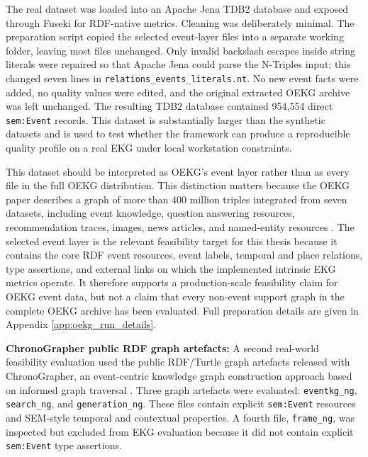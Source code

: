 The real dataset was loaded into an Apache Jena TDB2 database and exposed through Fuseki for RDF-native metrics. Cleaning was deliberately minimal. The preparation script copied the selected event-layer files into a separate working folder, leaving most files unchanged. Only invalid backslash escapes inside string literals were repaired so that Apache Jena could parse the N-Triples input; this changed seven lines in \texttt{relations\_events\_literals.nt}. No new event facts were added, no quality values were edited, and the original extracted OEKG archive was left unchanged. The resulting TDB2 database contained 954,554 direct \texttt{sem:Event} records. This dataset is substantially larger than the synthetic datasets and is used to test whether the framework can produce a reproducible quality profile on a real EKG under local workstation constraints.

This dataset should be interpreted as OEKG's event layer rather than as every file in the full OEKG distribution. This distinction matters because the OEKG paper describes a graph of more than 400 million triples integrated from seven datasets, including event knowledge, question answering resources, recommendation traces, images, news articles, and named-entity resources \citep{oekg2023}. The selected event layer is the relevant feasibility target for this thesis because it contains the core RDF event resources, event labels, temporal and place relations, type assertions, and external links on which the implemented intrinsic EKG metrics operate. It therefore supports a production-scale feasibility claim for OEKG event data, but not a claim that every non-event support graph in the complete OEKG archive has been evaluated. Full preparation details are given in Appendix \ref{app:oekg_run_details}.

\textbf{ChronoGrapher public RDF graph artefacts:} A second real-world feasibility evaluation used the public RDF/Turtle graph artefacts released with ChronoGrapher, an event-centric knowledge graph construction approach based on informed graph traversal \citep{chronographer2023}. Three graph artefacts were evaluated: \texttt{eventkg\_ng}, \texttt{search\_ng}, and \texttt{generation\_ng}. These files contain explicit \texttt{sem:Event} resources and SEM-style temporal and contextual properties. A fourth file, \texttt{frame\_ng}, was inspected but excluded from EKG evaluation because it did not contain explicit \texttt{sem:Event} type assertions.

